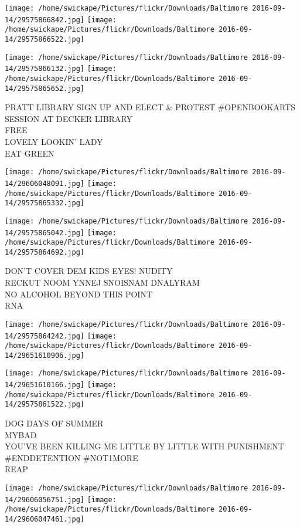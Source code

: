 \documentclass[10pt,letterpaper]{article}
\begin{document}
\texttt{[image: /home/swickape/Pictures/flickr/Downloads/Baltimore 2016-09-14/29575866842.jpg]}
\texttt{[image: /home/swickape/Pictures/flickr/Downloads/Baltimore 2016-09-14/29575866522.jpg]}

\texttt{[image: /home/swickape/Pictures/flickr/Downloads/Baltimore 2016-09-14/29575866132.jpg]}
\texttt{[image: /home/swickape/Pictures/flickr/Downloads/Baltimore 2016-09-14/29575865652.jpg]}

PRATT LIBRARY SIGN UP AND ELECT \& PROTEST \#OPENBOOKARTS SESSION AT DECKER LIBRARY\\
FREE\\
LOVELY LOOKIN' LADY\\
EAT GREEN
\pagebreak

\texttt{[image: /home/swickape/Pictures/flickr/Downloads/Baltimore 2016-09-14/29606048091.jpg]}
\texttt{[image: /home/swickape/Pictures/flickr/Downloads/Baltimore 2016-09-14/29575865332.jpg]}

\texttt{[image: /home/swickape/Pictures/flickr/Downloads/Baltimore 2016-09-14/29575865042.jpg]}
\texttt{[image: /home/swickape/Pictures/flickr/Downloads/Baltimore 2016-09-14/29575864692.jpg]}

DON'T COVER DEM KIDS EYES!  NUDITY\\
RECKUT NOOM YNNEJ SNOISNAM DNALYRAM\\
NO ALCOHOL BEYOND THIS POINT\\
RNA
\pagebreak

\texttt{[image: /home/swickape/Pictures/flickr/Downloads/Baltimore 2016-09-14/29575864242.jpg]}
\texttt{[image: /home/swickape/Pictures/flickr/Downloads/Baltimore 2016-09-14/29651610906.jpg]}

\texttt{[image: /home/swickape/Pictures/flickr/Downloads/Baltimore 2016-09-14/29651610166.jpg]}
\texttt{[image: /home/swickape/Pictures/flickr/Downloads/Baltimore 2016-09-14/29575861522.jpg]}

DOG DAYS OF SUMMER\\
MYBAD\\
YOU'VE BEEN KILLING ME LITTLE BY LITTLE WITH PUNISHMENT \#ENDDETENTION \#NOT1MORE\\
REAP
\pagebreak

\texttt{[image: /home/swickape/Pictures/flickr/Downloads/Baltimore 2016-09-14/29606056751.jpg]}
\texttt{[image: /home/swickape/Pictures/flickr/Downloads/Baltimore 2016-09-14/29606047461.jpg]}
\end{document}
